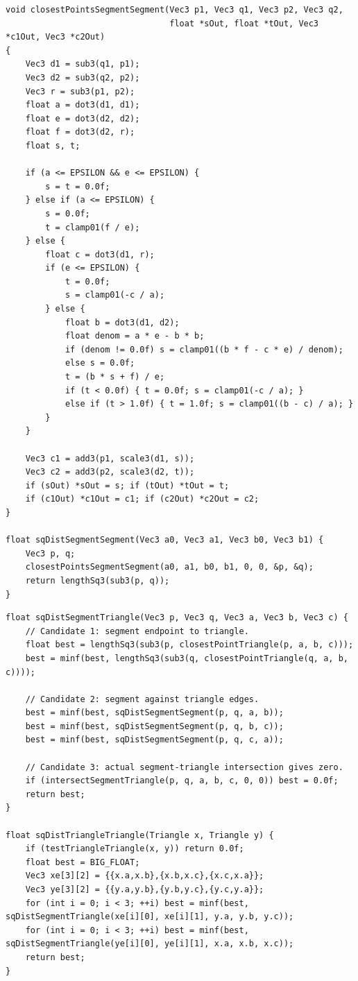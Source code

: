 \documentclass[10pt,letterpaper]{article}
\begin{document}
\begin{verbatim}
void closestPointsSegmentSegment(Vec3 p1, Vec3 q1, Vec3 p2, Vec3 q2,
                                 float *sOut, float *tOut, Vec3 *c1Out, Vec3 *c2Out)
{
    Vec3 d1 = sub3(q1, p1);
    Vec3 d2 = sub3(q2, p2);
    Vec3 r = sub3(p1, p2);
    float a = dot3(d1, d1);
    float e = dot3(d2, d2);
    float f = dot3(d2, r);
    float s, t;

    if (a <= EPSILON && e <= EPSILON) {
        s = t = 0.0f;
    } else if (a <= EPSILON) {
        s = 0.0f;
        t = clamp01(f / e);
    } else {
        float c = dot3(d1, r);
        if (e <= EPSILON) {
            t = 0.0f;
            s = clamp01(-c / a);
        } else {
            float b = dot3(d1, d2);
            float denom = a * e - b * b;
            if (denom != 0.0f) s = clamp01((b * f - c * e) / denom);
            else s = 0.0f;
            t = (b * s + f) / e;
            if (t < 0.0f) { t = 0.0f; s = clamp01(-c / a); }
            else if (t > 1.0f) { t = 1.0f; s = clamp01((b - c) / a); }
        }
    }

    Vec3 c1 = add3(p1, scale3(d1, s));
    Vec3 c2 = add3(p2, scale3(d2, t));
    if (sOut) *sOut = s; if (tOut) *tOut = t;
    if (c1Out) *c1Out = c1; if (c2Out) *c2Out = c2;
}

float sqDistSegmentSegment(Vec3 a0, Vec3 a1, Vec3 b0, Vec3 b1) {
    Vec3 p, q;
    closestPointsSegmentSegment(a0, a1, b0, b1, 0, 0, &p, &q);
    return lengthSq3(sub3(p, q));
}
\end{verbatim}

\begin{verbatim}
float sqDistSegmentTriangle(Vec3 p, Vec3 q, Vec3 a, Vec3 b, Vec3 c) {
    // Candidate 1: segment endpoint to triangle.
    float best = lengthSq3(sub3(p, closestPointTriangle(p, a, b, c)));
    best = minf(best, lengthSq3(sub3(q, closestPointTriangle(q, a, b, c))));

    // Candidate 2: segment against triangle edges.
    best = minf(best, sqDistSegmentSegment(p, q, a, b));
    best = minf(best, sqDistSegmentSegment(p, q, b, c));
    best = minf(best, sqDistSegmentSegment(p, q, c, a));

    // Candidate 3: actual segment-triangle intersection gives zero.
    if (intersectSegmentTriangle(p, q, a, b, c, 0, 0)) best = 0.0f;
    return best;
}

float sqDistTriangleTriangle(Triangle x, Triangle y) {
    if (testTriangleTriangle(x, y)) return 0.0f;
    float best = BIG_FLOAT;
    Vec3 xe[3][2] = {{x.a,x.b},{x.b,x.c},{x.c,x.a}};
    Vec3 ye[3][2] = {{y.a,y.b},{y.b,y.c},{y.c,y.a}};
    for (int i = 0; i < 3; ++i) best = minf(best, sqDistSegmentTriangle(xe[i][0], xe[i][1], y.a, y.b, y.c));
    for (int i = 0; i < 3; ++i) best = minf(best, sqDistSegmentTriangle(ye[i][0], ye[i][1], x.a, x.b, x.c));
    return best;
}
\end{verbatim}
\end{document}

